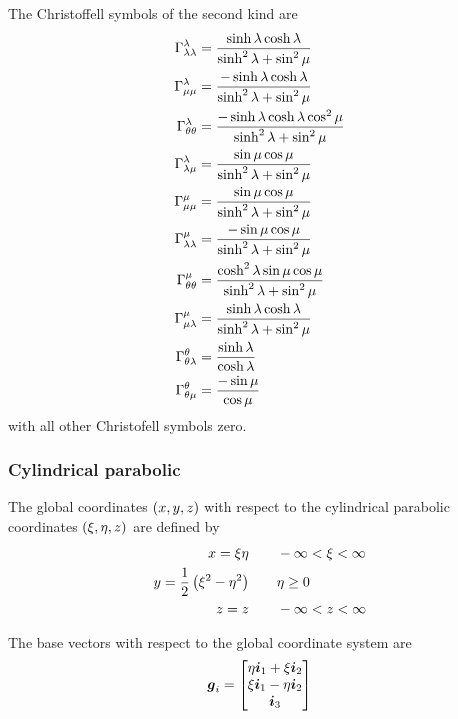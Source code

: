 The Christoffell symbols of the second kind are
\begin{align}
   \Gamma^{\lambda}_{\lambda\lambda} &=\frac{\sinh\lambda\cosh\lambda}{\sinh^{2}\lambda+\sin^{2}\mu} \\
   \Gamma^{\lambda}_{\mu\mu} &=\frac{-\sinh\lambda\cosh\lambda}{\sinh^{2}\lambda+\sin^{2}\mu} \\
   \Gamma^{\lambda}_{\theta\theta} &=\frac{-\sinh\lambda\cosh\lambda\cos^{2}\mu}{\sinh^{2}\lambda+\sin^{2}\mu} \\
   \Gamma^{\lambda}_{\lambda\mu} &=\frac{\sin\mu\cos\mu}{\sinh^{2}\lambda+\sin^{2}\mu} \\
   \Gamma^{\mu}_{\mu\mu} &=\frac{\sin\mu\cos\mu}{\sinh^{2}\lambda+\sin^{2}\mu} \\
   \Gamma^{\mu}_{\lambda\lambda} &=\frac{-\sin\mu\cos\mu}{\sinh^{2}\lambda+\sin^{2}\mu} \\
   \Gamma^{\mu}_{\theta\theta} &=\frac{\cosh^{2}\lambda\sin\mu\cos\mu}{\sinh^{2}\lambda+\sin^{2}\mu} \\
   \Gamma^{\mu}_{\mu\lambda} &=\frac{\sinh\lambda\cosh\lambda}{\sinh^{2}\lambda+\sin^{2}\mu} \\
   \Gamma^{\theta}_{\theta\lambda} &=\frac{\sinh\lambda}{\cosh\lambda} \\
   \Gamma^{\theta}_{\theta\mu} &=\frac{-\sin\mu}{\cos\mu} \\
\end{align}
with all other Christofell symbols zero.

\subsubsection{Cylindrical parabolic}

The global coordinates $\left( x,y,z \right)$ with respect to the cylindrical parabolic
coordinates $\left( \xi,\eta,z \right)$  are defined by
\begin{equation}
  \begin{aligned}
    x = \xi\eta & \qquad -\infty < \xi < \infty \\
    y = \frac{1}{2}\left( \xi^{2}-\eta^{2} \right) & \qquad \eta \ge 0 \\
    z =  z & \qquad -\infty < z < \infty
  \end{aligned}
\end{equation}

The base vectors with respect to the global coordinate system are
\begin{equation}
  \boldsymbol{g}_{i}=\begin{bmatrix} 
    \eta\boldsymbol{i}_{1}+\xi\boldsymbol{i}_{2}\\
    \xi\boldsymbol{i}_{1}-\eta\boldsymbol{i}_{2}\\    
    \boldsymbol{i}_{3}
  \end{bmatrix}
\end{equation}

